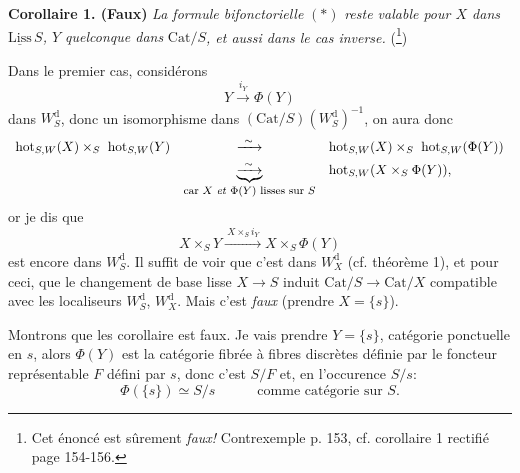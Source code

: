 \documentclass[11pt]{article}
\newcommand{\msp}[1]{\marginpar{\footnotesize [#1]}}
\newcommand{\Cat}{\mathrm{Cat}}
\newcommand{\hot}{\mathrm{hot}}
\newcommand{\Liss}{\underline{\mathrm{Liss}}\,}
\newcommand{\dd}{\mathrm{d}}
\begin{document}
\textbf{Corollaire 1. (Faux)} \textit{La formule bifonctorielle} $(*)$ \textit{reste valable pour $X$ dans} $\Liss S$\textit{, $Y$ quelconque dans} $\Cat/S$\textit{, et aussi dans le cas inverse.} (\footnote[73]{Cet énoncé est sûrement \textit{faux!} Contrexemple p. 153, cf. corollaire 1 rectifié page 154-156.})

Dans le premier cas, considérons
\[
Y \xrightarrow{i_Y} \Phi(Y)
\]
dans $W^{\dd}_S$, donc un isomorphisme dans $(\Cat/S)(W^{\dd}_S)^{-1}$, on aura donc
\[
\begin{array}{lcl}
\hot_{S,W}(X) \times_S\ \hot_{S,W}(Y) & \xrightarrow{\ \sim\ } & \hot_{S,W}(X) \times_S\ \hot_{S,W}(\Phi(Y)) \\[1ex]
 & \underbrace{\xrightarrow{\ \sim\ }}_{\text{\footnotesize car $X$ \textit{et} $\Phi(Y)$ lisses sur $S$}} & \hot_{S,W}(X \times_S \Phi(Y)),
\end{array}
\]
or je dis que
\[
X \times_S Y \xrightarrow{\ X\times_S i_Y\ } X \times_S \Phi(Y)
\]
est encore dans $W^{\dd}_S$. Il suffit de voir que c'est dans $W^{\dd}_X$ (cf. théorème 1), et pour ceci, que le changement de base lisse $X \longrightarrow S$ induit $\Cat/S \longrightarrow \Cat/X$ compatible avec les localiseurs $W^{\dd}_S$, $W^{\dd}_X$. Mais c'est \textit{faux} (prendre $X = \{s\}$).

\msp{page 153}
Montrons que les corollaire est faux. Je vais prendre $Y = \{s\}$, catégorie ponctuelle en $s$, alors $\Phi(Y)$ est la catégorie fibrée à fibres discrètes définie par le foncteur représentable $F$ défini par $s$, donc c'est $S/F$ et, en l'occurence $S/s$: %
\[
\Phi(\{s\}) \simeq S/s \qquad\quad \text{comme catégorie sur } S.
\]
\end{document}
